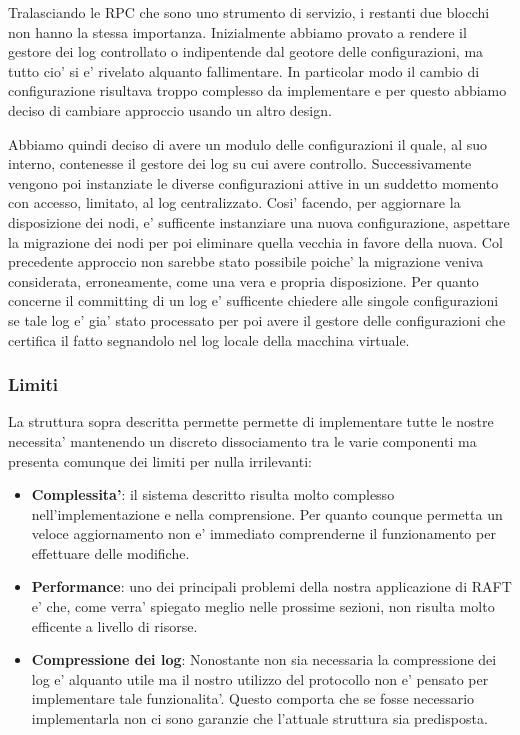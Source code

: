 Tralasciando le RPC che sono uno strumento di servizio, i restanti due blocchi non hanno la stessa
importanza. Inizialmente abbiamo provato a rendere il gestore dei log controllato o indipentende 
dal geotore delle configurazioni, ma tutto cio' si e' rivelato alquanto fallimentare.
In particolar modo il cambio di configurazione risultava troppo complesso da implementare 
e per questo abbiamo deciso di cambiare approccio usando un altro design. 

Abbiamo quindi deciso di avere un modulo delle configurazioni il quale, al suo interno, contenesse
il gestore dei log su cui avere controllo.
Successivamente vengono poi instanziate le diverse configurazioni attive in un suddetto momento
con accesso, limitato, al log centralizzato.
Cosi' facendo, per aggiornare la disposizione dei nodi, e' sufficente instanziare una
nuova configurazione, aspettare la migrazione dei nodi per poi eliminare quella vecchia in favore 
della nuova. Col precedente approccio non sarebbe stato possibile poiche' la migrazione veniva 
considerata, erroneamente, come una vera e propria disposizione. 
Per quanto concerne il committing di un log e' sufficente chiedere alle singole configurazioni
se tale log e' gia' stato processato per poi avere il gestore delle configurazioni che certifica
il fatto segnandolo nel log locale della macchina virtuale.

\subsubsection{Limiti}
La struttura sopra descritta permette permette di implementare tutte le nostre necessita' 
mantenendo un discreto dissociamento tra le varie componenti ma presenta comunque dei limiti
per nulla irrilevanti:
\begin{itemize}
    \item \textbf{Complessita'}: il sistema descritto risulta molto complesso nell'implementazione 
        e nella comprensione. Per quanto counque permetta un veloce aggiornamento non e' 
        immediato comprenderne il funzionamento per effettuare delle modifiche.
    \item \textbf{Performance}: uno dei principali problemi della nostra applicazione di RAFT 
        e' che, come verra' spiegato meglio nelle prossime sezioni, non risulta molto efficente
        a livello di risorse. 
    \item \textbf{Compressione dei log}: Nonostante non sia necessaria la compressione dei log
        e' alquanto utile ma il nostro utilizzo del protocollo non e' pensato per implementare
        tale funzionalita'. Questo comporta che se fosse necessario implementarla
        non ci sono garanzie che l'attuale struttura sia predisposta.
\end{itemize}


